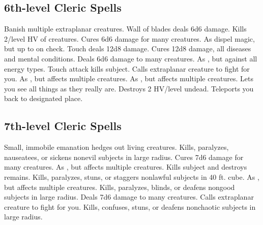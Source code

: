 \subsection{6th-level Cleric Spells}
\begin{spelllist}
   Banish multiple extraplanar creatures. 
   Wall of blades deals 6d6 damage.
  \M Kills 2/level HV of creatures.
   Cures 6d6 damage for many creatures.
   As dispel magic, but up to  on check.
   Touch deals 12d8 damage.
   Cures 12d8 damage, all diseases and mental conditions.
   Deals 6d6 damage to many creatures.
   As , but against all energy types.
   Touch attack kills subject.
   Calls extraplanar creature to fight for you.
   As , but affects multiple creatures.
   As , but affects multiple creatures.
  \M Lets you see all things as they really are.
  \M Destroys 2 HV/level undead.
   Teleports you back to designated place.
\end{spelllist}

\subsection{7th-level Cleric Spells}
\begin{spelllist}
   Small, immobile emanation hedges out living creatures.
   Kills, paralyzes, nauseatees, or sickens nonevil subjects in large radius.
   Cures 7d6 damage for many creatures.
   As , but affects multiple creatures.
  \F Kills subject and destroys remains.
   Kills, paralyzes, stuns, or staggers nonlawful subjects in 40 ft. cube.
   As , but affects multiple creatures.
   Kills, paralyzes, blinds, or deafens nongood subjects in large radius.
   Deals 7d6 damage to many creatures.
   Calls extraplanar creature to fight for you.
   Kills, confuses, stuns, or deafens nonchaotic subjects in large radius.
\end{spelllist}

